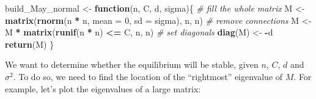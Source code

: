 \documentclass[]{book}
\newenvironment{Shaded}{\begin{snugshade}}{\end{snugshade}}
\newcommand{\CommentTok}[1]{\textcolor[rgb]{0.56,0.35,0.01}{\textit{#1}}}
\newcommand{\ControlFlowTok}[1]{\textcolor[rgb]{0.13,0.29,0.53}{\textbf{#1}}}
\newcommand{\DataTypeTok}[1]{\textcolor[rgb]{0.13,0.29,0.53}{#1}}
\newcommand{\DecValTok}[1]{\textcolor[rgb]{0.00,0.00,0.81}{#1}}
\newcommand{\KeywordTok}[1]{\textcolor[rgb]{0.13,0.29,0.53}{\textbf{#1}}}
\newcommand{\NormalTok}[1]{#1}
\newcommand{\OperatorTok}[1]{\textcolor[rgb]{0.81,0.36,0.00}{\textbf{#1}}}
\newcommand{\StringTok}[1]{\textcolor[rgb]{0.31,0.60,0.02}{#1}}
\begin{document}
\begin{Shaded}
\begin{Highlighting}[]
\NormalTok{build_May_normal <-}\StringTok{ }\ControlFlowTok{function}\NormalTok{(n, C, d, sigma)\{}
  \CommentTok{# fill the whole matrix}
\NormalTok{  M <-}\StringTok{ }\KeywordTok{matrix}\NormalTok{(}\KeywordTok{rnorm}\NormalTok{(n }\OperatorTok{*}\StringTok{ }\NormalTok{n, }\DataTypeTok{mean =} \DecValTok{0}\NormalTok{, }\DataTypeTok{sd =}\NormalTok{ sigma), n, n)}
  \CommentTok{# remove connections }
\NormalTok{  M <-}\StringTok{ }\NormalTok{M }\OperatorTok{*}\StringTok{ }\KeywordTok{matrix}\NormalTok{(}\KeywordTok{runif}\NormalTok{(n }\OperatorTok{*}\StringTok{ }\NormalTok{n) }\OperatorTok{<=}\StringTok{ }\NormalTok{C, n, n)}
  \CommentTok{# set diagonals}
  \KeywordTok{diag}\NormalTok{(M) <-}\StringTok{ }\OperatorTok{-}\NormalTok{d}
  \KeywordTok{return}\NormalTok{(M)}
\NormalTok{\}}
\end{Highlighting}
\end{Shaded}

We want to determine whether the equilibrium will be stable, given \(n\), \(C\), \(d\) and \(\sigma^2\). To do so, we need to find the location of the ``rightmost'' eigenvalue of \(M\). For example, let's plot the eigenvalues of a large matrix:
\end{document}
